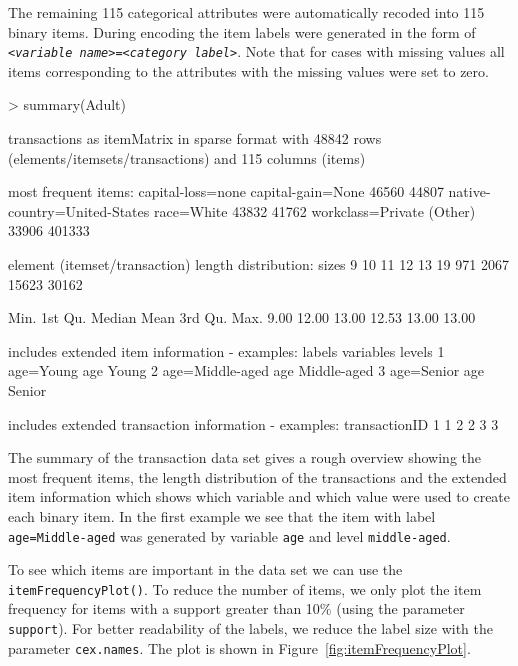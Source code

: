 \documentclass[10pt,a4paper]{article}
\newcommand{\func}[1]{\mbox{\texttt{#1()}}}
\newcommand{\code}[1]{\mbox{\texttt{#1}}}
\begin{document}
The remaining 115 categorical attributes were
automatically recoded into 115
binary items. During encoding the item labels were generated in the
form of 
\texttt{<\emph{variable name}>=<\emph{category label}>}. 
Note that for cases with missing values all items corresponding to the 
attributes with the missing values were set to zero.

\begin{Schunk}
\begin{Sinput}
> summary(Adult)
\end{Sinput}
\begin{Soutput}
transactions as itemMatrix in sparse format with
 48842 rows (elements/itemsets/transactions) and
 115 columns (items)

most frequent items:
           capital-loss=none            capital-gain=None 
                       46560                        44807 
native-country=United-States                   race=White 
                       43832                        41762 
           workclass=Private                      (Other) 
                       33906                       401333 

element (itemset/transaction) length distribution:
sizes
    9    10    11    12    13 
   19   971  2067 15623 30162 

   Min. 1st Qu.  Median    Mean 3rd Qu.    Max. 
   9.00   12.00   13.00   12.53   13.00   13.00 

includes extended item information - examples:
           labels variables      levels
1       age=Young       age       Young
2 age=Middle-aged       age Middle-aged
3      age=Senior       age      Senior

includes extended transaction information - examples:
  transactionID
1             1
2             2
3             3
\end{Soutput}
\end{Schunk}

The summary of the transaction data set gives a rough overview showing
the most frequent items, the length distribution of the transactions and
the extended item information which shows which variable and which value
were used to create each binary item. In the first example we see that
the item with label \code{age=Middle-aged} was generated by variable
\code{age} and level \code{middle-aged}.  

To see which items are important in the data set we can use the
\func{itemFrequencyPlot}. To reduce the number of items, we only plot
the item frequency for items with a support greater than 10\% (using the parameter \code{support}).  For
better readability of the labels, we reduce the label size with the
parameter \code{cex.names}. The plot is shown in Figure~\ref{fig:itemFrequencyPlot}.
\end{document}
